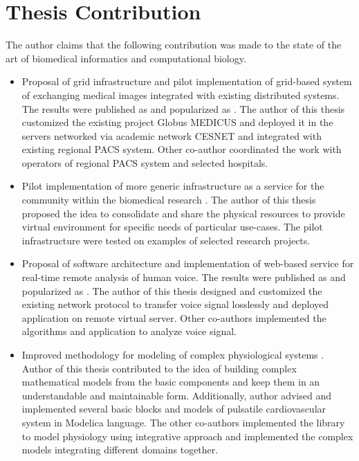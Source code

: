 \section{Thesis Contribution}
The author claims that the following contribution was made to the state of the art of biomedical informatics and computational biology.
\begin{itemize}
\item Proposal of grid infrastructure and pilot implementation of grid-based system of exchanging medical images integrated with existing distributed systems. The results were published as \cite{kulhanek2009} and popularized as \cite{Kulhanek2008Mefanet,Sarek2009,kulhanek2009dd}. The author of this thesis customized the existing project Globus MEDICUS and deployed it in the servers networked via academic network CESNET and integrated with existing regional PACS system. Other co-author coordinated the work with operators of regional PACS system and selected hospitals.
\item Pilot implementation of more generic infrastructure as a service for the community within the biomedical research \cite{kulhanek2010c, kulhanek2011dd}. The author of this thesis proposed the idea to consolidate and share the physical resources to provide virtual environment for specific needs of particular use-cases. The pilot infrastructure were tested on examples of selected research projects.
\item Proposal of software architecture and implementation of web-based service for real-time remote analysis of human voice. The results were published as \cite{kulhanek2010b} and popularized as \cite{Kulhanek2010d, Kulhanek2012}. The author of this thesis designed and customized the existing network protocol to transfer voice signal losslessly and deployed application on remote virtual server. Other co-authors implemented the algorithms and application to analyze voice signal.
\item Improved methodology for modeling of complex physiological systems \cite{Kulhanek2014Modeling, Kulhanek2014mefanet, Matejak2014, kofranek2013hummod}. Author of this thesis contributed to the idea of building complex  mathematical models from the basic components and keep them in an understandable and maintainable form. Additionally, author advised and implemented several basic blocks and models of pulsatile cardiovascular system in Modelica language. The other co-authors implemented the library to model physiology using integrative approach and implemented the complex models integrating different domains together.

\end{itemize}
